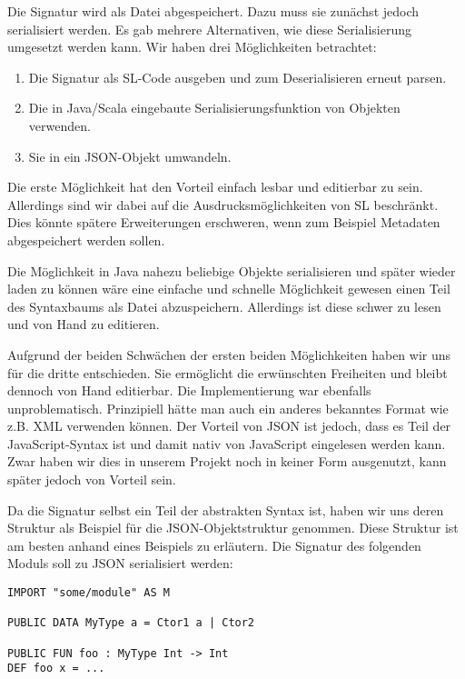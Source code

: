 \documentclass[runningheads]{llncs}
\begin{document}
Die Signatur wird als Datei abgespeichert. Dazu muss sie zunächst jedoch serialisiert werden. Es gab mehrere Alternativen, wie diese Serialisierung umgesetzt werden kann. Wir haben drei Möglichkeiten betrachtet:

\begin{enumerate}
 \item Die Signatur als SL-Code ausgeben und zum Deserialisieren erneut parsen.
 \item Die in Java/Scala eingebaute Serialisierungsfunktion von Objekten verwenden.
 \item Sie in ein JSON-Objekt umwandeln.
\end{enumerate}

Die erste Möglichkeit hat den Vorteil einfach lesbar und editierbar zu sein. Allerdings sind wir dabei auf die Ausdrucksmöglichkeiten von SL beschränkt. Dies könnte spätere Erweiterungen erschweren, wenn zum Beispiel Metadaten abgespeichert werden sollen.

Die Möglichkeit in Java nahezu beliebige Objekte serialisieren und später wieder laden zu können wäre eine einfache und schnelle Möglichkeit gewesen einen Teil des Syntaxbaums als Datei abzuspeichern. Allerdings ist diese schwer zu lesen und von Hand zu editieren.

Aufgrund der beiden Schwächen der ersten beiden Möglichkeiten haben wir uns für die dritte entschieden. Sie ermöglicht die erwünschten Freiheiten und bleibt dennoch von Hand editierbar. Die Implementierung war ebenfalls unproblematisch. Prinzipiell hätte man auch ein anderes bekanntes Format wie z.B. XML verwenden können. Der Vorteil von JSON ist jedoch, dass es Teil der JavaScript-Syntax ist und damit nativ von JavaScript eingelesen werden kann. Zwar haben wir dies in unserem Projekt noch in keiner Form ausgenutzt, kann später jedoch von Vorteil sein.

Da die Signatur selbst ein Teil der abstrakten Syntax ist, haben wir uns deren Struktur als Beispiel für die JSON-Objektstruktur genommen. Diese Struktur ist am besten anhand eines Beispiels zu erläutern. Die Signatur des folgenden Moduls soll zu JSON serialisiert werden:

\begin{verbatim}
IMPORT "some/module" AS M

PUBLIC DATA MyType a = Ctor1 a | Ctor2

PUBLIC FUN foo : MyType Int -> Int
DEF foo x = ...
\end{verbatim}
\end{document}
